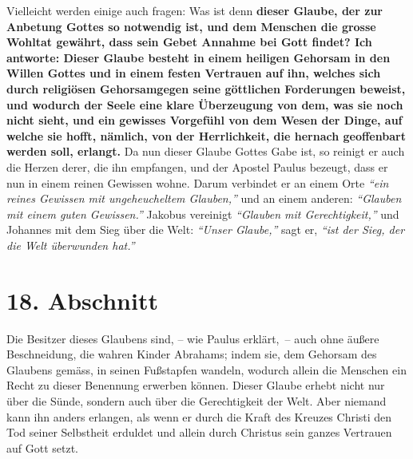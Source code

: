 Vielleicht werden einige auch fragen: Was ist denn \textbf{dieser Glaube, der
zur
Anbetung Gottes so notwendig ist, und dem Menschen die grosse Wohltat gewährt,
dass sein Gebet Annahme bei Gott findet? Ich antworte: Dieser Glaube besteht in
einem heiligen Gehorsam in den Willen Gottes und in einem festen Vertrauen auf
ihn, welches sich durch religiösen Gehorsamgegen
seine göttlichen Forderungen
beweist, und wodurch der Seele eine klare Überzeugung von dem, was sie noch
nicht sieht, und ein gewisses Vorgefühl von dem Wesen der Dinge, auf welche sie
hofft, nämlich, von der Herrlichkeit, die hernach geoffenbart werden soll,
erlangt.} Da nun dieser Glaube Gottes Gabe ist, so reinigt er auch die Herzen
derer, die ihn empfangen, und der Apostel Paulus bezeugt, dass er nun in einem
reinen Gewissen wohne. Darum verbindet er an einem Orte
\textit{"`ein reines Gewissen mit ungeheucheltem Glauben,"'} und an einem
anderen: \textit{"`Glauben mit einem guten
Gewissen."'}
Jakobus vereinigt
\textit{"`Glauben mit Gerechtigkeit,"'}
und Johannes mit dem Sieg über
die Welt:\textit{ "`Unser Glaube,"'} sagt er, \textit{"`ist der Sieg, der die
Welt überwunden hat."'}

\section{18. Abschnitt} \label{kap6_ab18}

Die Besitzer dieses Glaubens sind, -- wie Paulus erklärt,~-- auch ohne äußere
Beschneidung, die wahren Kinder
Abrahams; indem sie, dem Gehorsam des Glaubens
gemäss, in seinen Fußstapfen wandeln,
wodurch allein die
Menschen ein Recht zu dieser Benennung erwerben können. Dieser Glaube erhebt
nicht nur über die Sünde, sondern auch über die
Gerechtigkeit der Welt.
Aber niemand kann ihn anders erlangen, als wenn
er durch die Kraft des Kreuzes Christi den Tod seiner
Selbstheit
erduldet und allein durch Christus sein ganzes Vertrauen auf Gott setzt.

\medskip

